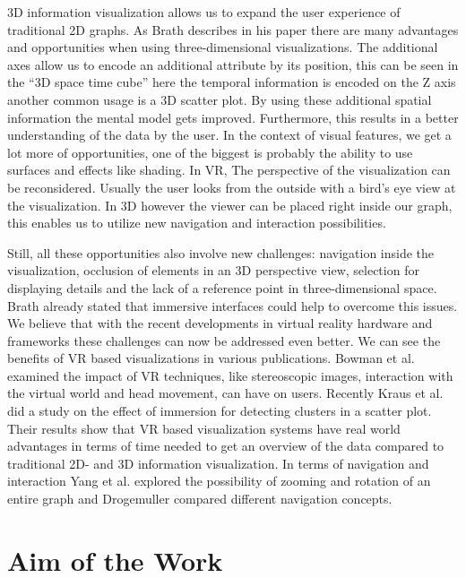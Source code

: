 3D information visualization allows us to expand the user experience of traditional 2D graphs. As Brath describes in his paper \cite{brath_3d_2014} there are many advantages and opportunities when using three-dimensional visualizations.
The additional axes allow us to encode an additional attribute by its position, this can be seen in the “3D space time cube” \cite{brath_3d_2014} here the temporal information is encoded on the Z axis another common usage is a 3D scatter plot. By using these additional spatial information the mental model gets improved. Furthermore, this results in a better understanding of the data by the user.
In the context of visual features, we get a lot more of opportunities, one of the biggest is probably the ability to use surfaces and effects like shading. 
In VR, The perspective of the visualization can be reconsidered. Usually the user looks from the outside with a bird's eye view at the visualization. In 3D however the viewer can be placed right inside our graph, this enables us to utilize new navigation and interaction possibilities. 

Still, all these opportunities also involve new challenges: navigation inside the visualization, occlusion of elements in an 3D perspective view, selection for displaying details and the lack of a reference point in three-dimensional space. Brath \cite{brath_3d_2014} already stated that immersive interfaces could help to overcome this issues.
 We believe that with the recent developments in virtual reality hardware and frameworks these challenges can now be addressed even better. 
 We can see the benefits of VR based visualizations in various publications. Bowman et al. \cite{bowman_virtual_2007} examined the impact of VR techniques, like stereoscopic images, interaction with the virtual world and head movement, can have on users. 
 Recently Kraus et al. \cite{kraus_impact_2020} did a study on the effect of immersion for detecting clusters in a scatter plot. Their results show that VR based visualization systems have real world advantages in terms of time needed to get an overview of the data compared to traditional 2D- and 3D information visualization. In terms of navigation and interaction Yang et al. \cite{yang_embodied_2020} explored the possibility of zooming and rotation of an entire graph and Drogemuller \cite{drogemuller_examining_2020} compared different navigation concepts.
 
\section{Aim of the Work}

